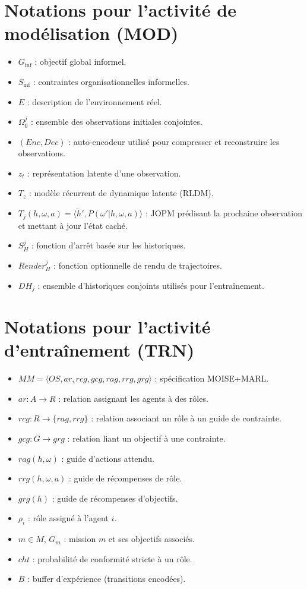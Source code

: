 \section{Notations pour l'activité de modélisation (MOD)}

\begin{itemize}
       \item $G_{\text{inf}}$ : objectif global informel.
       \item $S_{\text{inf}}$ : contraintes organisationnelles informelles.
       \item $E$ : description de l'environnement réel.
       \item $\Omega^j_0$ : ensemble des observations initiales conjointes.
       \item $(Enc, Dec)$ : auto-encodeur utilisé pour compresser et reconstruire les observations.
       \item $z_t$ : représentation latente d'une observation.
       \item $T_z$ : modèle récurrent de dynamique latente (RLDM).
       \item $T_j(h,\omega,a) = \langle \tilde{h}', P(\omega'|h,\omega,a)\rangle$ : JOPM prédisant la prochaine observation et mettant à jour l'état caché.
       \item $S^j_H$ : fonction d'arrêt basée sur les historiques.
       \item $Render^j_H$ : fonction optionnelle de rendu de trajectoires.
       \item $DH_j$ : ensemble d'historiques conjoints utilisés pour l'entraînement.
\end{itemize}

\section{Notations pour l'activité d'entraînement (TRN)}

\begin{itemize}
       \item $MM = \langle OS, ar, rcg, gcg, rag, rrg, grg \rangle$ : spécification MOISE+MARL.
       \item $ar : A \to R$ : relation assignant les agents à des rôles.
       \item $rcg : R \to \{rag, rrg\}$ : relation associant un rôle à un guide de contrainte.
       \item $gcg : G \to grg$ : relation liant un objectif à une contrainte.
       \item $rag(h,\omega)$ : guide d'actions attendu.
       \item $rrg(h,\omega,a)$ : guide de récompenses de rôle.
       \item $grg(h)$ : guide de récompenses d'objectifs.
       \item $\rho_i$ : rôle assigné à l'agent $i$.
       \item $m \in M$, $G_m$ : mission $m$ et ses objectifs associés.
       \item $cht$ : probabilité de conformité stricte à un rôle.
       \item $B$ : buffer d'expérience (transitions encodées).
\end{itemize}

